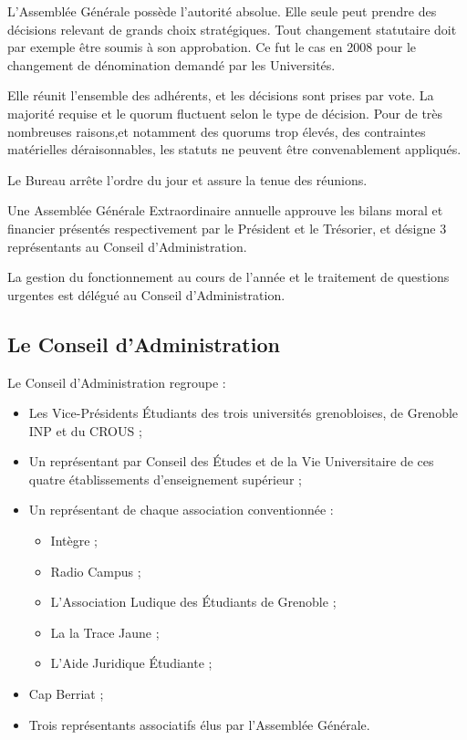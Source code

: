 L'Assemblée Générale possède l'autorité absolue. Elle seule peut prendre des
décisions relevant de grands choix stratégiques. Tout changement statutaire
doit par exemple être soumis à son approbation. Ce fut le cas en 2008 pour le
changement de dénomination demandé par les Universités.

Elle réunit l'ensemble des adhérents,
et les décisions sont prises par vote.
La majorité requise et le quorum fluctuent selon le type de décision.
Pour de très nombreuses raisons,et notamment des quorums trop élevés,
des contraintes matérielles déraisonnables, les statuts ne peuvent être
convenablement appliqués.

Le Bureau arrête l'ordre du jour et assure la tenue des réunions.

Une Assemblée Générale Extraordinaire annuelle approuve les bilans moral et
financier présentés respectivement par le Président et le Trésorier,
et désigne 3 représentants au Conseil d'Administration.

La gestion du fonctionnement au cours de l'année et le traitement de questions
urgentes est délégué au Conseil d'Administration.

\subsection{Le Conseil d'Administration}
\label{ca}

Le Conseil d'Administration regroupe :

\begin{itemize}
\item Les Vice-Présidents Étudiants des trois universités grenobloises, de Grenoble INP et du CROUS ;
\item Un représentant par Conseil des Études et de la Vie Universitaire de ces quatre établissements d'enseignement supérieur ;
\item Un représentant de chaque association conventionnée :
	\begin{itemize}
	\item Intègre ;
	\item Radio Campus ;
	\item L'Association Ludique des Étudiants de Grenoble ;
	\item La la Trace Jaune ;
	\item L'Aide Juridique Étudiante ;
	\end{itemize}
\item Cap Berriat ;
\item Trois représentants associatifs élus par l'Assemblée Générale.
\end{itemize}

